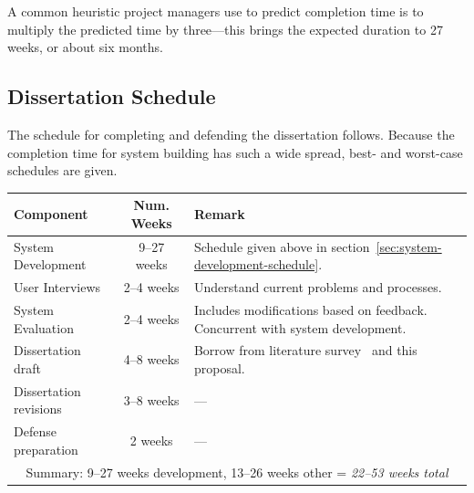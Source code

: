 \documentclass[11pt]{article}
\begin{document}
A common heuristic project managers use to predict completion time is
to multiply the predicted time by three---this brings the expected
duration to 27 weeks, or about six months.

\subsection{Dissertation Schedule}

The schedule for completing and defending the dissertation
follows. Because the completion time for system building has such a
wide spread, best- and worst-case schedules are given.

\vspace{12pt}
\begin{tabular}{ | l | c | p{80mm} | }
  \hline

  \textbf{Component} & \textbf{Num. Weeks} & \textbf{Remark} \\

  \hline \hline

  System Development & 9--27 weeks & Schedule given above in
  section~\ref{sec:system-development-schedule}. \\

  User Interviews & 2--4 weeks & Understand current problems and
  processes. \\

  System Evaluation & 2--4 weeks & Includes modifications based on
  feedback. Concurrent with system development. \\ 

  Dissertation draft & 4--8 weeks & Borrow from literature
  survey~\cite{johnson-sketch-review} and this proposal. \\

  Dissertation revisions & 3--8 weeks & ---\\

  Defense preparation & 2 weeks & ---\\

  \hline

  \multicolumn{3}{|c|}{
    Summary: 9--27 weeks development, 13--26 weeks other = 
    \textit{22--53 weeks total}
  } \\

  \hline

\end{tabular}

\singlespacing\newpage



\end{document}
